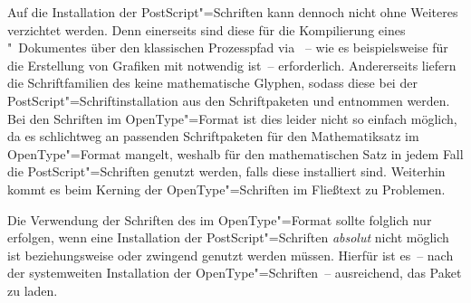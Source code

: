 \begin{Declaration*}{}
\begin{Declaration*}{}
\begin{Declaration*}{}
Auf die Installation der PostScript"=Schriften kann dennoch nicht ohne Weiteres 
verzichtet werden. Denn einerseits sind diese für die Kompilierung eines 
"~Dokumentes über den klassischen Prozesspfad via
~-- wie es 
beispielsweise für die Erstellung von Grafiken mit  notwendig 
ist~-- erforderlich. Andererseits liefern die Schriftfamilien des \CDs keine 
mathematische Glyphen, sodass diese bei der PostScript"=Schriftinstallation aus 
den Schriftpaketen  und  entnommen werden. Bei 
den Schriften im OpenType"=Format ist dies leider nicht so einfach möglich, da 
es schlichtweg an passenden Schriftpaketen für den Mathematiksatz im 
OpenType"=Format mangelt, weshalb für den mathematischen Satz in jedem Fall die 
PostScript"=Schriften genutzt werden, falls diese installiert sind. Weiterhin 
kommt es beim Kerning der OpenType"=Schriften im Fließtext zu Problemen.

Die Verwendung der Schriften des \CDs im OpenType"=Format sollte folglich nur 
erfolgen, wenn eine Installation der PostScript"=Schriften \emph{absolut} nicht 
möglich ist beziehungsweise  oder  zwingend 
genutzt werden müssen. Hierfür ist es~-- nach der systemweiten Installation der 
OpenType"=Schriften~-- ausreichend, das Paket  zu laden.
%




\end{Declaration*}
\end{Declaration*}
\end{Declaration*}

